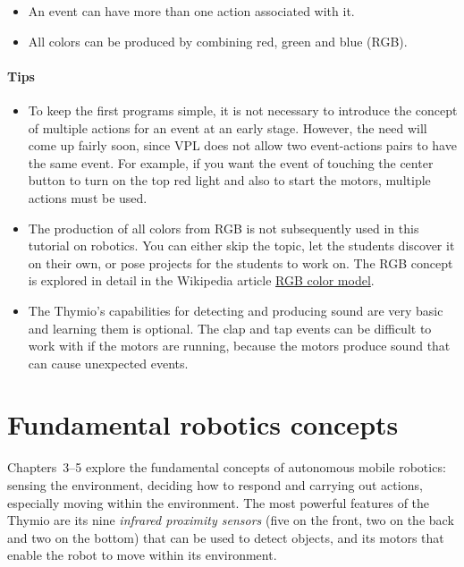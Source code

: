 \documentclass[11pt,a4paper,english]{article}
\begin{document}
\begin{itemize}

\item An event can have more than one action associated with it.

\item All colors can be produced by combining red, green and blue (RGB).

\end{itemize}

\paragraph{Tips}
\begin{itemize}

\item To keep the first programs simple, it is not necessary to
introduce the concept of multiple actions for an event at an early
stage. However, the need will come up fairly soon, since VPL does not
allow two event-actions pairs to have the same event. For example, if
you want the event of touching the center button to turn on the top red
light and also to start the motors, multiple actions must be used.

\item The production of all colors from RGB is not subsequently used in
this tutorial on robotics. You can either skip the topic, let the
students discover it on their own, or pose projects for the students to
work on. The RGB concept is explored in detail in the Wikipedia article
\href{https://en.wikipedia.org/wiki/RGB_color_model}{RGB color model}.

\item The Thymio's capabilities for detecting and producing sound are
very basic and learning them is optional. The clap and tap events
can be difficult to work with if the motors are running, because the
motors produce sound that can cause unexpected events.

\end{itemize}


\section{Fundamental robotics concepts}

Chapters~3--5 explore the fundamental concepts of autonomous mobile
robotics: sensing the environment, deciding how to respond and carrying
out actions, especially moving within the environment. The most powerful
features of the Thymio are its nine \emph{infrared proximity sensors}
(five on the front, two on the back and two on the bottom) that can be
used to detect objects, and its motors that enable the robot to move
within its environment.
\end{document}

